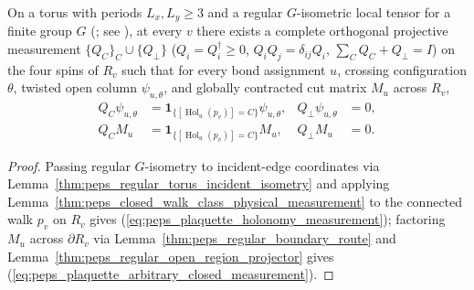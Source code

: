 \begin{lemma}%
    \label{thm:peps_torus_plaquette_holonomy_measurement}
    \leanok
    On a torus with periods $L_x,L_y\ge3$ and a regular $G$-isometric local tensor for a finite group $G$ (\cite[proof of Theorem~6.15]{Schuch2010PEPS}; see \cite{gap:rmp_peps_quantum_double_g_isometry}), at every $v$ there exists a complete orthogonal projective measurement $\{Q_C\}_C\cup\{Q_\perp\}$ ($Q_i=Q_i^\dagger\ge0$, $Q_iQ_j=\delta_{ij}Q_i$, $\sum_CQ_C+Q_\perp=I$) on the four spins of $R_v$ such that for every bond assignment $u$, crossing configuration $\theta$, twisted open column $\psi_{u,\theta}$, and globally contracted cut matrix $M_u$ across $R_v$,
    \begin{align}
        Q_C\psi_{u,\theta}
                               & =\mathbf1_{\{[\operatorname{Hol}_u(p_v)]=C\}}\psi_{u,\theta}, &
        Q_\perp\psi_{u,\theta} & =0,
        \label{eq:peps_plaquette_holonomy_measurement}                                           \\
        Q_CM_u                 & =\mathbf1_{\{[\operatorname{Hol}_u(p_v)]=C\}}M_u,             &
        Q_\perp M_u            & =0.
        \label{eq:peps_plaquette_arbitrary_closed_measurement}
    \end{align}
\end{lemma}
\begin{proof}\leanok
    Passing regular $G$-isometry to incident-edge coordinates via Lemma~\ref{thm:peps_regular_torus_incident_isometry} and applying Lemma~\ref{thm:peps_closed_walk_class_physical_measurement} to the connected walk $p_v$ on $R_v$ gives (\ref{eq:peps_plaquette_holonomy_measurement}); factoring $M_u$ across $\partial R_v$ via Lemma~\ref{thm:peps_regular_boundary_route} and Lemma~\ref{thm:peps_regular_open_region_projector} gives (\ref{eq:peps_plaquette_arbitrary_closed_measurement}).
\end{proof}

